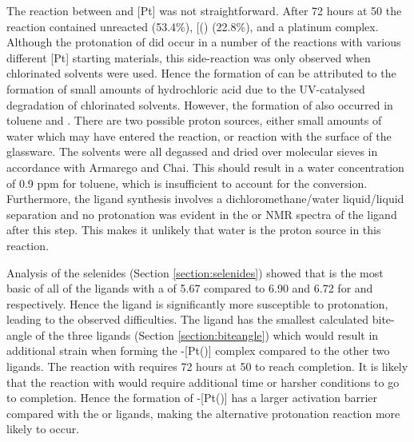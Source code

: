 The reaction between \tBusixantphos{} and [Pt] was not straightforward.  After 72 hours at 50\degC{} the reaction contained unreacted \tBusixantphos{} (53.4\%), [(\tBusixantphos)\ce{H]+} (22.8\%), and a platinum complex.  Although the protonation of \tButhixantphos{} did occur in a number of the reactions with various different [Pt] starting materials, this side-reaction was only observed when chlorinated solvents were used.  Hence the formation of \tButhixantphos {} can be attributed to the formation of small amounts of hydrochloric acid due to the UV-catalysed degradation of chlorinated solvents.  However, the formation of \tBusixantphos {} also occurred in toluene and .  There are two possible proton sources, either small amounts of water which may have entered the reaction, or reaction with the surface of the glassware.  The solvents were all degassed and dried over molecular sieves in accordance with Armarego and Chai.\cite{Purificationbook}  This should result in a water concentration of 0.9 ppm for toluene, which is insufficient to account for the conversion.\cite{Williams2010}  Furthermore, the \tBusixantphos{} ligand synthesis involves a dichloromethane/water liquid/liquid separation and no protonation was evident in the \proton{} or \phosphorus{} NMR spectra of the \tBusixantphos{} ligand after this step.  This makes it unlikely that water is the proton source in this reaction.  

Analysis of the \tBuxantphos{} selenides (Section \ref{section:selenides}) showed that \tBusixantphos{} is the most basic of all of the ligands with a \pKb{} of 5.67 compared to 6.90 and 6.72 for \tButhixantphos{} and \tBuxantphos{} respectively.  Hence the \tBusixantphos{} ligand is significantly more susceptible to protonation, leading to the observed difficulties.  The \tBusixantphos{} ligand has the smallest calculated bite-angle of the three ligands (Section \ref{section:biteangle}) which would result in additional strain when forming the \trans-[Pt(\tBusixantphos)] complex compared to the other two ligands.  The reaction with \tButhixantphos{} requires 72 hours at 50 \degC{} to reach completion.  It is likely that the reaction with \tBusixantphos{} would require additional time or harsher conditions to go to completion.  Hence the formation of \trans-[Pt(\tBusixantphos)] has a larger activation barrier compared with the \tButhixantphos{} or \tBuxantphos{} ligands, making the alternative protonation reaction more likely to occur.  

